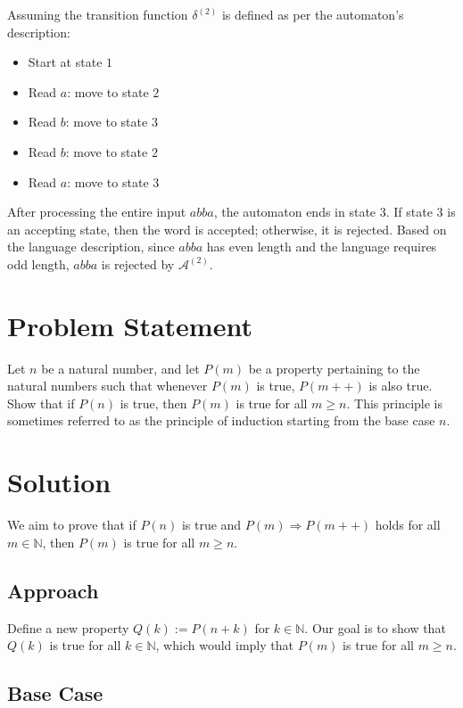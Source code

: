 \documentclass[11pt]{article}
\begin{document}
\begin{itemize}[leftmargin=*]
Assuming the transition function $\delta^{(2)}$ is defined as per the automaton's description:

\begin{itemize}
    \item Start at state $1$
    \item Read $a$: move to state $2$
    \item Read $b$: move to state $3$
    \item Read $b$: move to state $2$
    \item Read $a$: move to state $3$
\end{itemize}

After processing the entire input $abba$, the automaton ends in state $3$. If state $3$ is an accepting state, then the word is accepted; otherwise, it is rejected. Based on the language description, since $abba$ has even length and the language requires odd length, $abba$ is rejected by $\mathcal{A}^{(2)}$.

\section*{Problem Statement}

Let \( n \) be a natural number, and let \( P(m) \) be a property pertaining to the natural numbers such that whenever \( P(m) \) is true, \( P(m++) \) is also true. Show that if \( P(n) \) is true, then \( P(m) \) is true for all \( m \geq n \). This principle is sometimes referred to as the principle of induction starting from the base case \( n \).

\section*{Solution}

We aim to prove that if \( P(n) \) is true and \( P(m) \Rightarrow P(m++) \) holds for all \( m \in \mathbb{N} \), then \( P(m) \) is true for all \( m \geq n \).

\subsection*{Approach}

Define a new property \( Q(k) := P(n + k) \) for \( k \in \mathbb{N} \). Our goal is to show that \( Q(k) \) is true for all \( k \in \mathbb{N} \), which would imply that \( P(m) \) is true for all \( m \geq n \).

\subsection*{Base Case}


\end{itemize}
\end{document}
